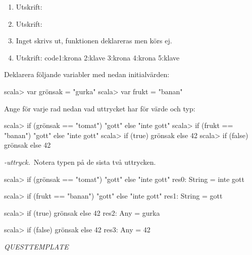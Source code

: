 \SOLUTION

\TaskSolved \what

\begin{enumerate}
\item Utskrift: 
\item Utskrift: 
\item Inget skrivs ut, funktionen deklareras men körs ej.
\item Utskrift: code{1:krona 2:klave 3:krona 4:krona 5:klave }
\end{enumerate}

\QUESTEND





\def\what{\emph{\code{if}\textit{-uttryck}.}}

\QUESTBEGIN

\Task  Deklarera följande variabler med nedan initialvärden:  

\begin{REPLnonum}
scala> var grönsak = "gurka"
scala> var frukt = "banan"
\end{REPLnonum}

Ange för varje rad nedan vad uttrycket har för värde och typ:
\begin{REPLnonum}
scala> if (grönsak == "tomat") "gott" else "inte gott" 
scala> if (frukt == "banan") "gott" else "inte gott" 
scala> if (true) grönsak else 42 
scala> if (false) grönsak else 42 
\end{REPLnonum}

\SOLUTION


\TaskSolved \what~Notera typen  på de sista två uttrycken.

\begin{REPLnonum}
scala> if (grönsak == "tomat") "gott" else "inte gott"
res0: String = inte gott

scala> if (frukt == "banan") "gott" else "inte gott"
res1: String = gott

scala> if (true) grönsak else 42
res2: Any = gurka

scala> if (false) grönsak else 42
res3: Any = 42
\end{REPLnonum}


\QUESTEND






\def\what{\emph{QUESTTEMPLATE}}

\QUESTBEGIN

\Task \what

\Subtask

